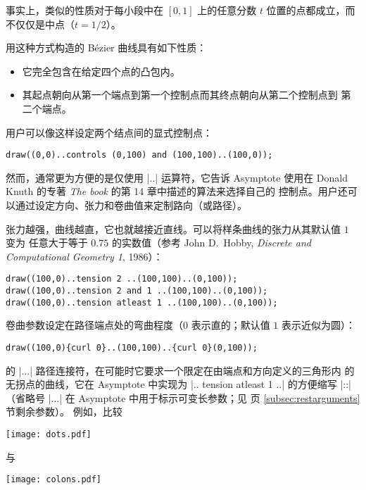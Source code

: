\documentclass[nofonts,CJKnormalspaces]{ctexbook}[2009/05/20]
\newcommand*\prgname[1]{\textsf{#1}}
\begin{document}
事实上，类似的性质对于每小段中在 $[0,1]$ 上的任意分数 $t$ 位置的点都成立，而
不仅仅是中点（$t=1/2$）。

用这种方式构造的 Bézier 曲线具有如下性质：
\begin{itemize}
  \item 它完全包含在给定四个点的凸包内。
  \item 其起点朝向从第一个端点到第一个控制点而其终点朝向从第二个控制点到
    第二个端点。
\end{itemize}

用户可以像这样设定两个结点间的显式控制点：
\begin{lstlisting}
draw((0,0)..controls (0,100) and (100,100)..(100,0));
\end{lstlisting}

然而，通常更为方便的是仅使用 |..| 运算符，它告诉 \prgname{Asymptote} 使用在
Donald Knuth 的专著 \textit{The \MF{}book} 的第 14 章中描述的算法来选择自己的
控制点。用户还可以通过设定方向、张力和卷曲值来定制路向（或路径）。

张力越强，曲线越直，它也就越接近直线。可以将样条曲线的张力从其默认值 $1$ 变为
任意大于等于 $0.75$ 的实数值（参考 John D.~Hobby, \textit{Discrete and
Computational Geometry 1}, 1986）：
\begin{lstlisting}
draw((100,0)..tension 2 ..(100,100)..(0,100));
draw((100,0)..tension 2 and 1 ..(100,100)..(0,100));
draw((100,0)..tension atleast 1 ..(100,100)..(0,100));
\end{lstlisting}

卷曲参数设定在路径端点处的弯曲程度（$0$ 表示直的；默认值 $1$ 表示近似为圆）：
\begin{lstlisting}
draw((100,0){curl 0}..(100,100)..{curl 0}(0,100));
\end{lstlisting}

\MP{} 的 |...| 路径连接符，在可能时它要求一个限定在由端点和方向定义的三角形内
的无拐点的曲线，它在 \prgname{Asymptote} 中实现为 |.. tension atleast 1 ..|
的方便缩写 |::|（省略号 |...| 在 \prgname{Asymptote} 中用于标示可变长参数；见
\pageref{subsec:restarguments} 页 \ref{subsec:restarguments} 节剩余参数）。
例如，比较

\begin{center}
  \texttt{[image: dots.pdf]}
\end{center}
与

\begin{center}
  \texttt{[image: colons.pdf]}
\end{center}
\end{document}
